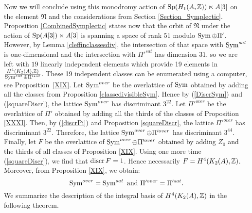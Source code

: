 Now we will conclude using this monodromy action of $\operatorname{Sp}(H_1(A,\mathbb{Z}))\ltimes A[3]$ on the element $\mathfrak{N}$ and the considerations from Section \ref{Section_Symplectic}. 
Proposition \ref{CombinedSymplectic} states now that
the orbit of $\mathfrak{N}$ under the action of $\operatorname{Sp}(A[3])\ltimes A[3]$ is spanning a space of rank $51$ modulo $\operatorname{Sym}\oplus\Pi'$. However, by Lemma \ref{cleffinclassesdiv}, the intersection of that space with $\operatorname{Sym}^{sat}$ is one-dimensional and the intersection with $\Pi'^{sat}$ has dimension $31$, so we are left with $19$ linearly independent elements which provide 19 elements in $\frac{H^4(K_2(A),\mathbb{Z})}{\operatorname{Sym}^{sat}\oplus\Pi'^{sat}}$.
These 19 independent classes can be enumerated using a computer, see Proposition~\ref{XIX}.
Let $\operatorname{Sym}^{over}$ be the overlattice of $\operatorname{Sym}$ obtained by adding all the classes from Proposition \ref{classedivisibleSym}. Hence by (\ref{DiscrSym}) and (\ref{squareDiscr}), the lattice $\operatorname{Sym}^{over}$ has discriminant $3^{22}$. Let $\Pi'^{over}$ be the overlattice of $\Pi'$ obtained by adding all the thirds of the classes of Proposition \ref{XXXI}. Then, by (\ref{discrPi}) and Proposition \ref{squareDiscr}, the lattice $\Pi'^{over}$ has discriminant $3^{22}$. Therefore, the lattice $\operatorname{Sym}^{over}\oplus \Pi'^{over}$ has discriminant $3^{44}$. Finally, let $F$ be the overlattice of $\operatorname{Sym}^{over}\oplus \Pi'^{over}$ obtained by adding $Z_0$ and the thirds of all classes of Proposition \ref{XIX}. Using one more time (\ref{squareDiscr}), we find that $\operatorname{discr} F=1$. Hence necessarily $F=H^4(K_2(A),\mathbb{Z})$. Moreover, from Proposition \ref{XIX}, we obtain: $$\operatorname{Sym}^{over}=\operatorname{Sym}^{sat} \text{ and } \Pi'^{over}=\Pi'^{sat}.$$ We summarize the description of the integral basis of $H^{4}(K_2(A),\mathbb{Z})$ in the following theorem.
